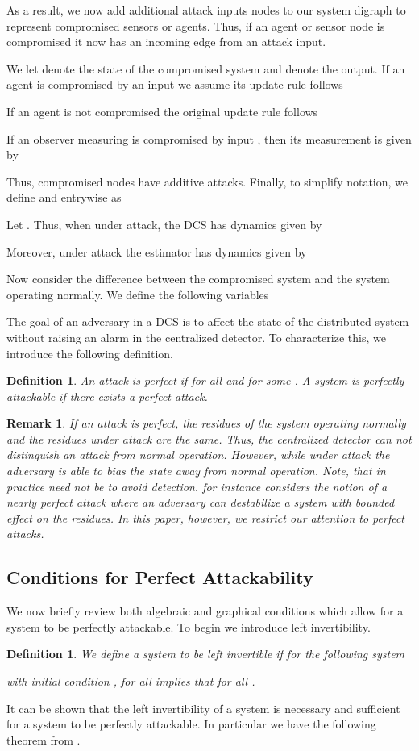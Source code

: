 \documentclass[letterpaper, 10 pt, conference]{ieeeconf}
\newtheorem{remark}[theorem]{Remark}
\newtheorem{definition}[theorem]{Definition}
\begin{document}
As a result, we now add additional attack inputs nodes to our system digraph to represent compromised sensors or agents. Thus, if an agent or sensor node is compromised it now has an incoming edge from an attack input.

We let  denote the state of the compromised system and  denote the output. If an agent  is compromised by an input  we assume its update rule follows

If an agent  is not compromised the original update rule follows

If an observer  measuring  is compromised by input , then its measurement is given by

Thus, compromised nodes have additive attacks. 
Finally, to simplify notation, we define  and  entrywise as 

Let . Thus, when under attack, the DCS has dynamics given by 

Moreover, under attack the estimator has dynamics given by


Now consider the difference between the compromised system and the system operating normally. We define the following variables



The goal of an adversary in a DCS is to affect the state of the distributed system without raising an alarm in the centralized detector. To characterize this, we introduce the following definition.

\begin{definition} 
An attack is perfect if  for all  and  for some . A system  is perfectly attackable if there exists a perfect attack.
\end{definition}
\begin{remark}
If an attack is perfect, the residues of the system operating normally and the residues under attack are the same. Thus, the centralized detector can not distinguish an attack from normal operation. However, while under attack the adversary is able to bias the state away from normal operation. Note, that in practice  need not be  to avoid detection. \cite{Cam2014} for instance considers the notion of a nearly perfect attack where an adversary can destabilize a system with bounded effect on the residues. In this paper, however, we restrict our attention to perfect attacks.
\end{remark}
\subsection{Conditions for Perfect Attackability}
We now briefly review both algebraic and graphical conditions which allow for a system to be perfectly attackable. To begin we introduce left invertibility.
\begin{definition}
We define a system  to be left invertible if for the following system

with initial condition ,  for all  implies that  for all .
\end{definition}
 It can be shown that the left invertibility of a system is necessary and sufficient for a system to be perfectly attackable. In particular we have the following theorem from \cite{Cam2014}.
\end{document}
